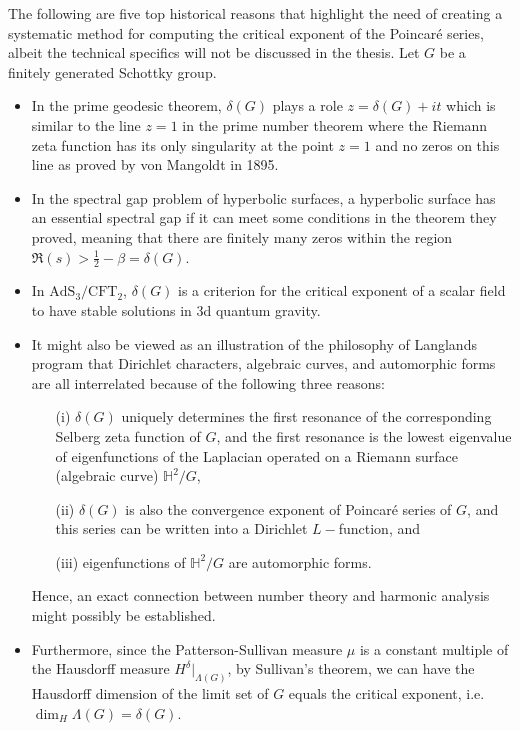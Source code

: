 \documentclass[12pt,oneside]{sfsuthesis}
\theoremstyle{plain} %
\theoremstyle{definition}  %
\theoremstyle{remark}  %
\theoremstyle{plain}
\begin{document}
{The following are five top historical reasons that highlight the need of creating a systematic method for computing the critical exponent of the Poincar\'{e} series, albeit the technical specifics will not be discussed in the thesis. Let $G$ be a finitely generated Schottky group. 
\begin{itemize}
\item In the prime geodesic theorem\cite{borthwick2007spectral}, $\delta(G)$ plays a role $z = \delta(G) + it$ which is similar to the line $z=1$ in the prime number theorem where the Riemann zeta function has its only singularity at the point $z = 1$ and no zeros on this line as proved by von Mangoldt in 1895.
\item In the spectral gap problem of hyperbolic surfaces, a hyperbolic surface has an essential spectral gap if it can meet some conditions in the theorem they proved\cite{bourgain2018spectral}, meaning that there are finitely many zeros within the region $\Re(s)>\frac{1}{2}-\beta=\delta(G)$.
\item In $\text{AdS}_3/\text{CFT}_2$, $\delta(G)$ is a criterion for the critical exponent of a scalar field to have stable solutions in 3d quantum gravity\cite{dong2018phase}. 
\item It might also be viewed as an illustration of the philosophy of Langlands program that Dirichlet characters, algebraic curves, and automorphic forms are all interrelated\cite{bump2003introduction,knapp1997introduction,knapp2009first,knapp2009prerequisites,mueller2021genesis} because of the following three reasons:
\begin{enumerate}
\item[(i)] $\delta(G)$ uniquely determines the first resonance of the corresponding Selberg zeta function of $G$, and the first resonance is the lowest eigenvalue of eigenfunctions of the Laplacian operated on a Riemann surface (algebraic curve) $\mathbb{H}^2/G$,
\item[(ii)] $\delta(G)$ is also the convergence exponent of Poincar\'{e} series of $G$, and this series can be written into a Dirichlet $L-$function, and
\item[(iii)] eigenfunctions of $\mathbb{H}^2/G$ are automorphic forms.
\end{enumerate}
Hence, an exact connection between number theory and harmonic analysis might possibly be established. 
\item Furthermore, since the Patterson-Sullivan measure $\mu$ is a constant multiple of the Hausdorff measure $H^{\delta}\vert_{\Lambda(G)}$, by Sullivan's theorem\cite{sullivan1984entropy}, we can have the Hausdorff dimension of the limit set of $G$ equals the critical exponent, i.e. $\dim_H\Lambda(G)=\delta(G)$.
\end{itemize}
 


}
\end{document}
